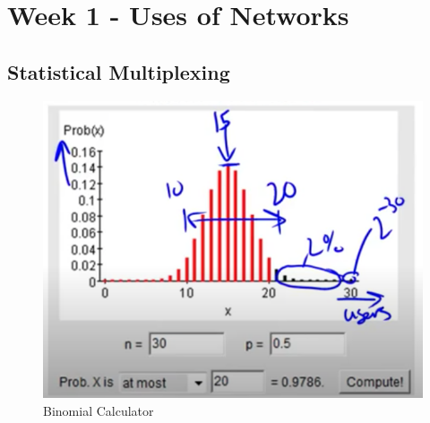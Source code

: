 \documentclass[12pt]{ctexart}   %
\begin{document}
\section{Week 1 - Uses of Networks}
	\subsection{Statistical Multiplexing}
	
	\begin{figure}[h!] %
	 \centering
	 \includegraphics[scale=1.0]{images/1-2-1}
	\caption{ Binomial Calculator }
	 \label{fig:1-2-1}
	 \end{figure}
	
\end{document}
